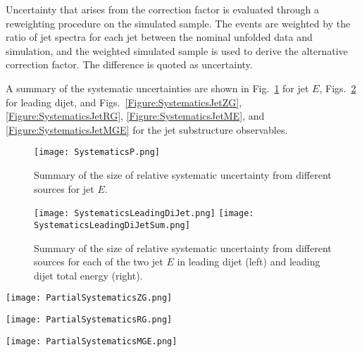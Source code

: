 \documentclass[aps,preprint,superscriptaddress,groupedaddress]{revtex4}  %
\begin{document}
Uncertainty that arises from the correction factor is evaluated through a reweighting procedure on the simulated sample.  The events are weighted by the ratio of jet spectra for each jet between the nominal unfolded data and simulation, and the weighted simulated sample is used to derive the alternative correction factor.  The difference is quoted as uncertainty.

A summary of the systematic uncertainties are shown in Fig.~\ref{Figure:SystematicsJetE} for jet $E$, Figs.~\ref{Figure:SystematicsLeadingDiJetE} for leading dijet, and Figs.~\ref{Figure:SystematicsJetZG}, \ref{Figure:SystematicsJetRG}, \ref{Figure:SystematicsJetME}, and \ref{Figure:SystematicsJetMGE} for the jet substructure observables.

\begin{figure}
    \centering
    \texttt{[image: SystematicsP.png]}
    \caption{Summary of the size of relative systematic uncertainty from different sources for jet $E$.}
    \label{Figure:SystematicsJetE}
\end{figure}

\begin{figure}
    \centering
    \texttt{[image: SystematicsLeadingDiJet.png]}
    \texttt{[image: SystematicsLeadingDiJetSum.png]}
    \caption{Summary of the size of relative systematic uncertainty from different sources for each of the two jet $E$ in leading dijet (left) and leading dijet total energy (right).}
    \label{Figure:SystematicsLeadingDiJetE}
\end{figure}


\begin{figure*}
    \centering
    \texttt{[image: PartialSystematicsZG.png]}
    \caption{Summary of the size of relative systematic uncertainty from different sources for $z_G$, in bins of jet $E$ from 10--15~GeV (left panel) to above 40~GeV (right panel).}
    \label{Figure:SystematicsJetZG}
\end{figure*}

\begin{figure*}
    \centering
    \texttt{[image: PartialSystematicsRG.png]}
    \caption{Summary of the size of relative systematic uncertainty from different sources for $R_G$, in bins of jet $E$ from 10--15~GeV (left panel) to above 40~GeV (right panel).}
    \label{Figure:SystematicsJetRG}
\end{figure*}


\begin{figure*}
    \centering
    \texttt{[image: PartialSystematicsMGE.png]}
    \caption{Summary of the size of relative systematic uncertainty from different sources for $M_G/E$, in bins of jet $E$ from 10--15~GeV (left panel) to above 40~GeV (right panel).}
    \label{Figure:SystematicsJetMGE}
\end{figure*}
\end{document}
